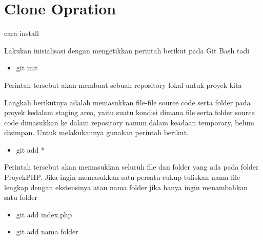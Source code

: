 \section{Clone Opration}
\vspace{14pt}
\noindent 
{\fontsize{16pt}{16pt}\selectfont cara install \\} \par
\vspace{16pt}
\noindent 
{\fontsize{14pt}{14pt}\selectfont Lakukan inisialisasi dengan mengetikkan perintah berikut pada Git Bash tadi \\} \par
\begin{itemize}
	\item git init
\end{itemize}
\vspace{14pt}
\noindent 
{\fontsize{14pt}{14pt}\selectfont Perintah tersebut akan membuat sebuah repository lokal untuk proyek kita \\} \par
\vspace{14pt}
\noindent 
{\fontsize{14pt}{14pt}\selectfont Langkah berikutnya adalah memasukkan file-file source code serta folder pada proyek kedalam staging area, yaitu suatu kondisi dimana file serta folder source code dimasukkan ke dalam repository namun dalam keadaan temporary, belum disimpan. Untuk melakukannya gunakan perintah berikut. \\} \par
\begin{itemize}
	\item git add *
\end{itemize}
\vspace{14pt}
\noindent 
{\fontsize{14pt}{14pt}\selectfont Perintah tersebut akan memasukkan seluruh file dan folder yang ada pada folder ProyekPHP. Jika ingin memasukkan satu persatu cukup tuliskan nama file lengkap dengan ekstensinya atau nama folder jika hanya ingin menambahkan satu folder \\} \par
\begin{itemize}
	\item git add index.php 
\end{itemize}
\begin{itemize}
	\item git add nama folder 
\end{itemize}


